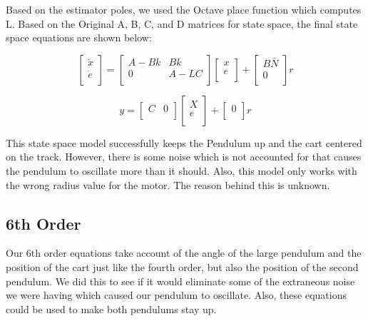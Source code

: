 \documentclass{article}
\begin{document}
Based on the estimator poles, we used the Octave place function which computes L. Based on the Original A, B, C, and D matrices for state space, the final state space equations are shown below:

\begin{equation}
\label{ss3}
\begin{bmatrix}
\dot{x}\\
\dot{e}\\
\end{bmatrix}
=
\begin{bmatrix}
A-Bk&Bk\\
0&A-LC\\
\end{bmatrix}
\begin{bmatrix}
x\\
e\\
\end{bmatrix} +
\begin{bmatrix}
B\bar{N}\\
0\\
\end{bmatrix} r
\end{equation}

\begin{equation}
\label{ss4}
y = 
\begin{bmatrix}
C&0\\
\end{bmatrix}
\begin{bmatrix}
X\\
e\\
\end{bmatrix} +
\begin{bmatrix}
0\\
\end{bmatrix} r
\end{equation}

This state space model successfully keeps the Pendulum up and the cart centered on the track. However, there is some noise which is not accounted for that causes the pendulum to oscillate more than it should. Also, this model only works with the wrong radius value for the motor. The reason behind this is unknown. 

\subsection{6th Order}
Our 6th order equations take account of the angle of the large pendulum and the position of the cart just like the fourth order, but also the position of the second pendulum. We did this to see if it would eliminate some of the extraneous noise we were having which caused our pendulum to oscillate. Also, these equations could be used to make both pendulums stay up. 
\end{document}
